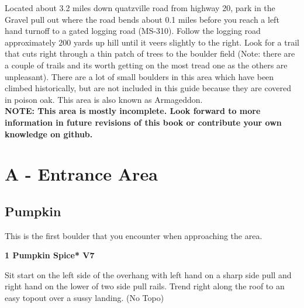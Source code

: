 

\raggedcolumns
\begin{multicols}{2}

\end{multicols}
\begin{multicols}{2}
Located about 3.2 miles down quatzville road from highway 20, park in the Gravel pull out where the road bends about 0.1 miles before you reach a left hand turnoff to a gated logging road (MS-310). Follow the logging road approximately 200 yards up hill until it veers slightly to the right. Look for a trail that cuts right through a thin patch of trees to the boulder field (Note: there are a couple of trails and its worth getting on the most tread one as the others are unpleasant). There are a lot of small boulders in this area which have been climbed historically, but are not included in this guide because they are covered in poison oak. This area is also known as Armageddon.\\

\textbf{NOTE: This area is mostly incomplete. Look forward to more information in future revisions of this book or contribute your own knowledge on github.}\\
\newpage

		\section{A - Entrance Area}\label{sa:Entrance Area}
	
	
		\subsection*{Pumpkin}\label{bf:Pumpkin}
		This is the first boulder that you encounter when approaching the area.\\
	
			\label{rt:Pumpkin Spice}
\colorbox{Goldenrod!50}{
\parbox{0.95\linewidth}{
\textbf{
1 Pumpkin Spice* V7  
}
}
}

			\begin{adjustwidth}{0.5cm}{}				
			Sit start on the left side of the overhang with left hand on a sharp side pull and right hand on the lower of two side pull rails. Trend right along the roof to an easy topout over a sussy landing.
				\newline (No Topo) 
			\end{adjustwidth}

\end{multicols}
